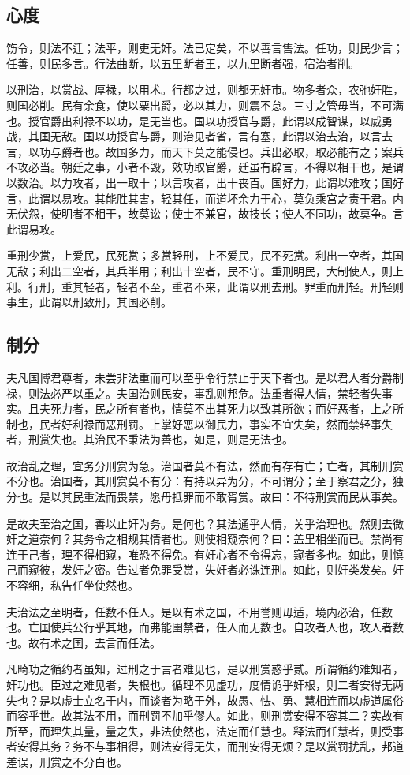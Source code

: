 \documentclass[]{article}
\begin{document}
\hypertarget{header-n1597}{%
\subsection{心度}\label{header-n1597}}

饬令，则法不迁；法平，则吏无奸。法已定矣，不以善言售法。任功，则民少言；任善，则民多言。行法曲断，以五里断者王，以九里断者强，宿治者削。

以刑治，以赏战、厚禄，以用术。行都之过，则都无奸市。物多者众，农弛奸胜，则国必削。民有余食，使以粟出爵，必以其力，则震不怠。三寸之管毋当，不可满也。授官爵出利禄不以功，是无当也。国以功授官与爵，此谓以成智谋，以威勇战，其国无敌。国以功授官与爵，则治见者省，言有塞，此谓以治去治，以言去言，以功与爵者也。故国多力，而天下莫之能侵也。兵出必取，取必能有之；案兵不攻必当。朝廷之事，小者不毁，效功取官爵，廷虽有辟言，不得以相干也，是谓以数治。以力攻者，出一取十；以言攻者，出十丧百。国好力，此谓以难攻；国好言，此谓以易攻。其能胜其害，轻其任，而道坏余力于心，莫负乘宫之责于君。内无伏怨，使明者不相干，故莫讼；使士不兼官，故技长；使人不同功，故莫争。言此谓易攻。

重刑少赏，上爱民，民死赏；多赏轻刑，上不爱民，民不死赏。利出一空者，其国无敌；利出二空者，其兵半用；利出十空者，民不守。重刑明民，大制使人，则上利。行刑，重其轻者，轻者不至，重者不来，此谓以刑去刑。罪重而刑轻。刑轻则事生，此谓以刑致刑，其国必削。

\hypertarget{header-n1598}{%
\subsection{制分}\label{header-n1598}}

夫凡国博君尊者，未尝非法重而可以至乎令行禁止于天下者也。是以君人者分爵制禄，则法必严以重之。夫国治则民安，事乱则邦危。法重者得人情，禁轻者失事实。且夫死力者，民之所有者也，情莫不出其死力以致其所欲；而好恶者，上之所制也，民者好利禄而恶刑罚。上掌好恶以御民力，事实不宜失矣，然而禁轻事失者，刑赏失也。其治民不秉法为善也，如是，则是无法也。

故治乱之理，宜务分刑赏为急。治国者莫不有法，然而有存有亡；亡者，其制刑赏不分也。治国者，其刑赏莫不有分：有持以异为分，不可谓分；至于察君之分，独分也。是以其民重法而畏禁，愿毋抵罪而不敢胥赏。故曰：不待刑赏而民从事矣。

是故夫至治之国，善以止奸为务。是何也？其法通乎人情，关乎治理也。然则去微奸之道奈何？其务令之相规其情者也。则使相窥奈何？曰：盖里相坐而已。禁尚有连于己者，理不得相窥，唯恐不得免。有奸心者不令得忘，窥者多也。如此，则慎己而窥彼，发奸之密。告过者免罪受赏，失奸者必诛连刑。如此，则奸类发矣。奸不容细，私告任坐使然也。

夫治法之至明者，任数不任人。是以有术之国，不用誉则毋适，境内必治，任数也。亡国使兵公行乎其地，而弗能圉禁者，任人而无数也。自攻者人也，攻人者数也。故有术之国，去言而任法。

凡畸功之循约者虽知，过刑之于言者难见也，是以刑赏惑乎贰。所谓循约难知者，奸功也。臣过之难见者，失根也。循理不见虚功，度情诡乎奸根，则二者安得无两失也？是以虚士立名于内，而谈者为略于外，故愚、怯、勇、慧相连而以虚道属俗而容乎世。故其法不用，而刑罚不加乎僇人。如此，则刑赏安得不容其二？实故有所至，而理失其量，量之失，非法使然也，法定而任慧也。释法而任慧者，则受事者安得其务？务不与事相得，则法安得无失，而刑安得无烦？是以赏罚扰乱，邦道差误，刑赏之不分白也。
\end{document}

